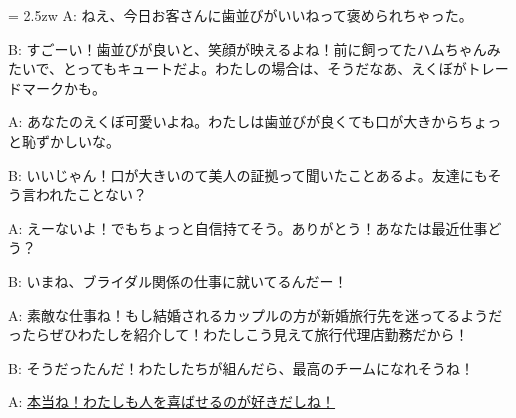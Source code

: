 \documentclass[11pt]{amsart}
\title{}
\author{}
\newenvironment{hangall}[1]{\hangindent = 2.5zw\everypar{\hangindent = 2.5zw}}{}
\begin{document}
\maketitle
\begin{hangall}{}%
A: ねえ、今日お客さんに歯並びがいいねって褒められちゃった。

B: すごーい！歯並びが良いと、笑顔が映えるよね！前に飼ってたハムちゃんみたいで、とってもキュートだよ。わたしの場合は、そうだなあ、えくぼがトレードマークかも。

A: あなたのえくぼ可愛いよね。わたしは歯並びが良くても口が大きからちょっと恥ずかしいな。

B: いいじゃん！口が大きいのて美人の証拠って聞いたことあるよ。友達にもそう言われたことない？

A: えーないよ！でもちょっと自信持てそう。ありがとう！あなたは最近仕事どう？

B: いまね、ブライダル関係の仕事に就いてるんだー！

A: 素敵な仕事ね！もし結婚されるカップルの方が新婚旅行先を迷ってるようだったらぜひわたしを紹介して！わたしこう見えて旅行代理店勤務だから！

B: そうだったんだ！わたしたちが組んだら、最高のチームになれそうね！

A: \ul{本当ね！わたしも人を喜ばせるのが好きだしね！}\end{hangall}
\end{document}
